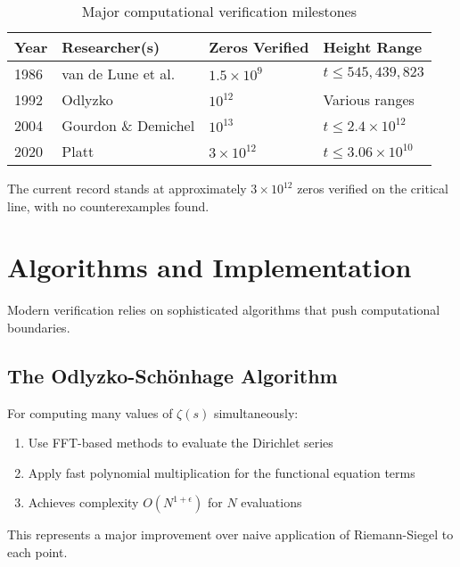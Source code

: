 \begin{table}[h]
\centering
\begin{tabular}{|l|l|l|l|}
\hline
\textbf{Year} & \textbf{Researcher(s)} & \textbf{Zeros Verified} & \textbf{Height Range} \\
\hline
1986 & van de Lune et al. & $1.5 \times 10^9$ & $t \leq 545,439,823$ \\
1992 & Odlyzko \cite{odlyzko1985} & $10^{12}$ & Various ranges \\
2004 & Gourdon \& Demichel & $10^{13}$ & $t \leq 2.4 \times 10^{12}$ \\
2020 & Platt \cite{plattrigaux2020} & $3 \times 10^{12}$ & $t \leq 3.06 \times 10^{10}$ \\
\hline
\end{tabular}
\caption{Major computational verification milestones}
\end{table}

\begin{remark}
The current record stands at approximately $3 \times 10^{12}$ zeros verified on the critical line, with no counterexamples found.
\end{remark}

\section{Algorithms and Implementation}
\label{sec:algorithms}

Modern verification relies on sophisticated algorithms that push computational boundaries.

\subsection{The Odlyzko-Schönhage Algorithm}

\begin{theorem}
For computing many values of $\zeta(s)$ simultaneously:
\begin{enumerate}
\item Use FFT-based methods to evaluate the Dirichlet series
\item Apply fast polynomial multiplication for the functional equation terms
\item Achieves complexity $O(N^{1+\epsilon})$ for $N$ evaluations
\end{enumerate}
\end{theorem}

This represents a major improvement over naive application of Riemann-Siegel to each point.

